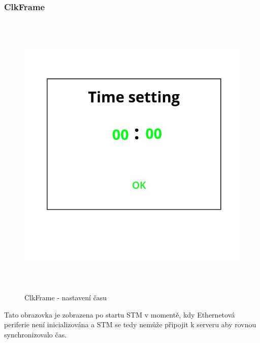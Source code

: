 \subsubsection{ClkFrame}
\begin{figure}[p]\centering
\includegraphics[width=140mm, height=140mm]{../img/clk_frame.jpg}
\caption{ClkFrame - nastavení času}
\label{clk-frame}
\end{figure}

Tato obrazovka je zobrazena po startu STM v momentě, kdy Ethernetová periferie není inicializována a
STM se tedy nemůže připojit k serveru aby rovnou synchronizovalo čas.

